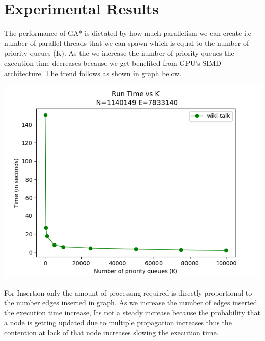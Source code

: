 \documentclass[a4paper]{article}
\begin{document}

\section{Experimental Results}

The performance of GA* \cite{GA*} is dictated by how much parallelism we can create i.e number of parallel threads that we can spawn which is equal to the number of priority queues (K). As the we increase the number of priority queues the execution time decreases because we get benefited from GPU's SIMD architecture. The trend follows as shown in graph below.
\begin{center}
\includegraphics[scale=0.45]{img/RvK.png}        
\end{center}
For Insertion only the amount of processing required is directly proportional to the number edges inserted in graph. As we increase the number of edges inserted the execution time increase, Its not a steady increase because the probability that a node is getting updated due to multiple propagation increases thus the contention at lock of that node increases slowing the execution time.
\end{document}
